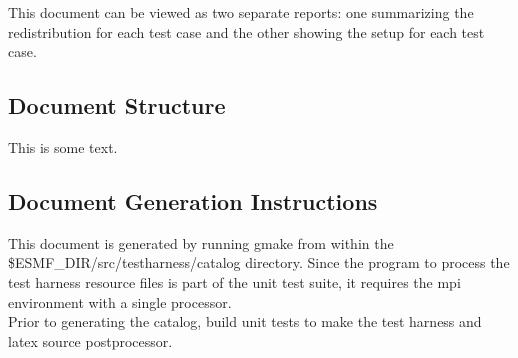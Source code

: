 \documentclass[english]{article}
\begin{document}
This document can be viewed as two separate reports: one summarizing the redistribution
for each test case and the other showing the setup for each test case. \\

\subsection{Document Structure}
This is some text.

\subsection{Document Generation Instructions}
This document is generated by running gmake from within the \$ESMF\_DIR/src/testharness/catalog
directory.  Since the program to process the test harness resource files is part of the unit test suite,
it requires the mpi environment with a single processor. \\

Prior to generating the catalog, build unit tests to make the test harness and
latex source postprocessor. \\






\end{document}
